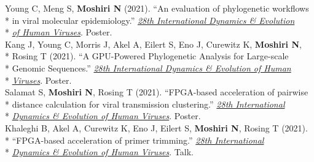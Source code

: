 \documentclass[margin,line]{res}
\begin{document}
\begin{resume}
\hspace*{4mm} Young C, Meng S, \textbf{Moshiri N} (2021). ``An evaluation of phylogenetic workflows\\*
\hspace*{9.5mm} in viral molecular epidemiology.'' \href{https://cpd.ucsd.edu/hivdynamics/}{\textit{28th International Dynamics \& Evolution}}\\*\vspace{2mm}
\hspace*{8mm} \href{https://cpd.ucsd.edu/hivdynamics/}{\textit{of Human Viruses}}. Poster.\\
\hspace*{4mm} Kang J, Young C, Morris J, Akel A, Eilert S, Eno J, Curewitz K, \textbf{Moshiri N},\\*
\hspace*{9.5mm}  Rosing T (2021). ``A GPU-Powered Phylogenetic Analysis for Large-scale\\*
\hspace*{9.5mm} Genomic Sequences.'' \href{https://cpd.ucsd.edu/hivdynamics/}{\textit{28th International Dynamics \& Evolution of Human}}\\*\vspace{2mm}
\hspace*{7.5mm} \href{https://cpd.ucsd.edu/hivdynamics/}{\textit{Viruses}}. Poster.\\
\hspace*{4mm} Salamat S, \textbf{Moshiri N}, Rosing T (2021). ``FPGA-based acceleration of pairwise\\*
\hspace*{9.5mm} distance calculation for viral transmission clustering.'' \href{https://cpd.ucsd.edu/hivdynamics/}{\textit{28th International}}\\*\vspace{2mm}
\hspace*{8mm} \href{https://cpd.ucsd.edu/hivdynamics/}{\textit{Dynamics \& Evolution of Human Viruses}}. Poster.\\
\hspace*{4mm} Khaleghi B, Akel A, Curewitz K, Eno J, Eilert S, \textbf{Moshiri N}, Rosing T (2021).\\*
\hspace*{9.5mm} ``FPGA-based acceleration of primer trimming.'' \href{https://cpd.ucsd.edu/hivdynamics/}{\textit{28th International}}\\*\vspace{2mm}
\hspace*{8mm} \href{https://cpd.ucsd.edu/hivdynamics/}{\textit{Dynamics \& Evolution of Human Viruses}}. Talk.\\

\end{resume}
\end{document}
